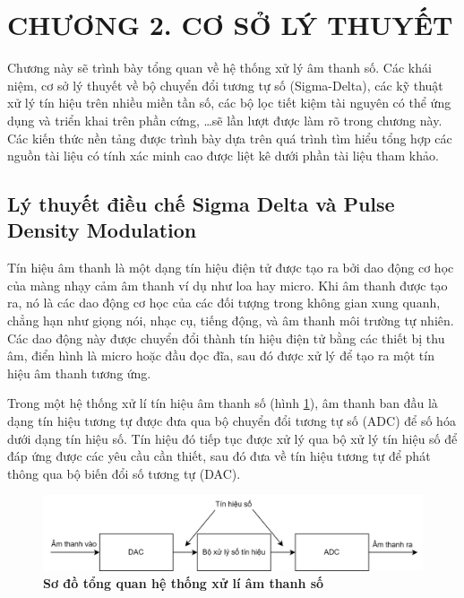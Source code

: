 \section*{CHƯƠNG 2. CƠ SỞ LÝ THUYẾT} \label{chuong2}
\setcounter{section}{2}
\setcounter{figure}{0}
\setcounter{table}{0}
Chương này sẽ trình bày tổng quan về hệ thống xử lý âm thanh số. Các khái niệm, cơ sở lý thuyết về bộ chuyển đổi tương tự số (Sigma-Delta), các kỹ thuật xử lý tín hiệu trên nhiều miền tần số, các bộ lọc tiết kiệm tài nguyên có thể ứng dụng và triển khai trên phần cứng, \ldots sẽ lần lượt được làm rõ trong chương này. Các kiến thức nền tảng được trình bày dựa trên quá trình tìm hiểu tổng hợp các nguồn tài liệu có tính xác minh cao được liệt kê dưới phần tài liệu tham khảo.

\subsection{ Lý thuyết điều chế Sigma Delta và Pulse Density Modulation}
Tín hiệu âm thanh là một dạng tín hiệu điện tử được tạo ra bởi dao động cơ học của màng nhạy cảm âm thanh ví dụ như loa hay micro. Khi âm thanh được tạo ra, nó là các dao động cơ học của các đối tượng trong không gian xung quanh, chẳng hạn như giọng nói, nhạc cụ, tiếng động, và âm thanh môi trường tự nhiên. Các dao động này được chuyển đổi thành tín hiệu điện tử bằng các thiết bị thu âm, điển hình là micro hoặc đầu đọc đĩa, sau đó được xử lý để tạo ra một tín hiệu âm thanh tương ứng.

Trong một hệ thống xử lí tín hiệu âm thanh số (hình \ref{hinh21}), âm thanh ban đầu là dạng tín hiệu tương tự  được đưa qua bộ chuyển đổi tương tự số (ADC) để số hóa dưới dạng tín hiệu số. Tín hiệu đó tiếp tục được xử lý qua bộ xử lý tín hiệu số để đáp ứng được các yêu cầu cần thiết, sau đó đưa về tín hiệu tương tự để phát thông qua bộ biến đổi số tương tự (DAC). 

\begin{figure}[!ht]
    \centering
    
    \includegraphics[width=15cm]{Images/top.png}
    \caption[Sơ đồ khối của hệ thống]{\bfseries \fontsize{12pt}{0pt}\selectfont Sơ đồ tổng quan hệ thống xử lí âm thanh số}
    \label{hinh21}
\end{figure}

